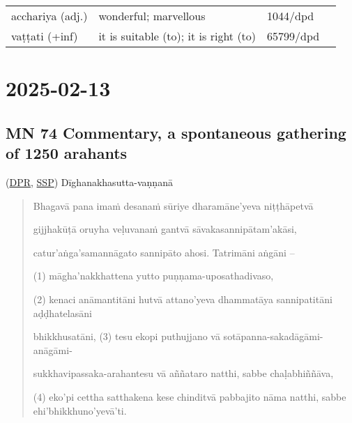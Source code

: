 \documentclass[11pt,oneside]{memoir}
\begin{document}
\begin{longtable}{L{\colOne} L{\colTwo} H H}
acchariya (adj.) & wonderful; marvellous & 1044/dpd & \\[0pt]
vaṭṭati (+inf) & it is suitable (to); it is right (to) & 65799/dpd & \\[0pt]
\end{longtable}

\chapter{2025-02-13}
\label{sec:org0e54fa2}
\section{MN 74 Commentary, a spontaneous gathering of 1250 arahants}
\label{sec:org818b3b1}
(\href{https://www.digitalpalireader.online/\_dprhtml/index.html?loc=m.1.2.0.0.3.0.a\&para=23}{DPR}, \href{http://localhost:4848/suttas/s0202a.att/pli/cst4?quote=ve\%25E1\%25B8\%25B7uvana\%25E1\%25B9\%2581\%2520gantv\%25C4\%2581\%2520s\%25C4\%2581vakasannip\%25C4\%2581tamak\%25C4\%2581si\&window\_type=Sutta+Study}{SSP}) Dīghanakhasutta-vaṇṇanā

\vspace*{-\baselineskip}

\begin{quote}
Bhagavā pana imaṁ desanaṁ sūriye dharamāne'yeva niṭṭhāpetvā

gijjhakūṭā oruyha veḷuvanaṁ gantvā sāvakasannipātam'akāsi,

catur'aṅga'samannāgato sannipāto ahosi. Tatrimāni aṅgāni –

(1) māgha'nakkhattena yutto puṇṇama-uposathadivaso,

(2) kenaci anāmantitāni hutvā attano'yeva dhammatāya sannipatitāni aḍḍhatelasāni

bhikkhusatāni, (3) tesu ekopi puthujjano vā sotāpanna-sakadāgāmi-anāgāmi-

sukkhavipassaka-arahantesu vā aññataro natthi, sabbe chaḷabhiññāva,

(4) eko'pi cettha satthakena kese chinditvā pabbajito nāma natthi, sabbe ehi'bhikkhuno'yevā'ti.
\end{quote}
\end{document}
